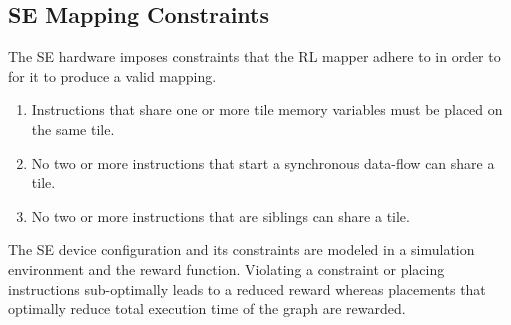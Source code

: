 \subsection{SE Mapping Constraints}
The SE hardware imposes constraints that the RL mapper adhere to in order to for it to produce a valid mapping.
\begin{enumerate}
  \item Instructions that share one or more tile memory variables must be placed on the same tile.
  \item No two or more instructions that start a synchronous data-flow can share a tile.
  \item No two or more instructions that are siblings can share a tile.
\end{enumerate}
The SE device configuration and its constraints are modeled in a simulation environment and the reward function. 
Violating a constraint or placing instructions sub-optimally leads to a reduced reward whereas placements that optimally reduce total execution time of the graph are rewarded. 